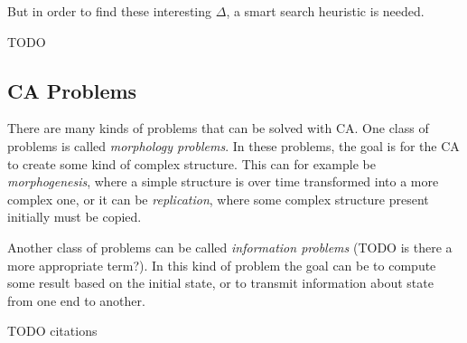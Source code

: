 But in order to find these interesting $\Delta$, a smart search heuristic is needed.


TODO

\subsection{CA Problems}
There are many kinds of problems that can be solved with CA.
One class of problems is called \textit{morphology problems}.
In these problems, the goal is for the CA to create some kind of complex structure.
This can for example be \textit{morphogenesis}, where a simple structure is over time transformed into a more complex one,
or it can be \textit{replication}, where some complex structure present initially must be copied.

Another class of problems can be called \textit{information problems} (TODO is there a more appropriate term?).
In this kind of problem the goal can be to compute some result based on the initial state, or to transmit information about state from one end to another.

TODO citations
